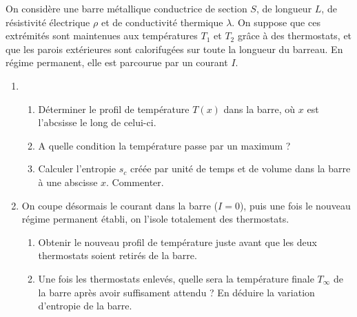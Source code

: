 On considère une barre métallique conductrice de section $S$, de longueur $L$, de résistivité électrique $\rho$ et de conductivité thermique $\lambda$. On suppose que ces extrémités sont maintenues aux températures $T_1$ et $T_2$ grâce à des thermostats, et que les parois extérieures sont calorifugées sur toute la longueur du barreau. En régime permanent, elle est parcourue par un courant $I$.

\begin{enumerate}

\item

\begin{enumerate}

	\item Déterminer le profil de température $T(x)$ dans la barre, où $x$ est l'abcsisse le long de celui-ci.
	
	\item A quelle condition la température passe par un maximum ? 
	
	\item Calculer l'entropie $s_c$ créée par unité de temps et de volume dans la barre à une abscisse $x$. Commenter.

\end{enumerate}

\item On coupe désormais le courant dans la barre ($I=0$), puis une fois le nouveau régime permanent établi, on l'isole totalement des thermostats.

\begin{enumerate}
		
	\item Obtenir le nouveau profil de température juste avant que les deux thermostats soient retirés de la barre.
	
	\item Une fois les thermostats enlevés, quelle sera la température finale $T_\infty$ de la barre après avoir suffisament attendu ? En déduire la variation d'entropie de la barre.
	
\end{enumerate}

\end{enumerate}

\newpage

